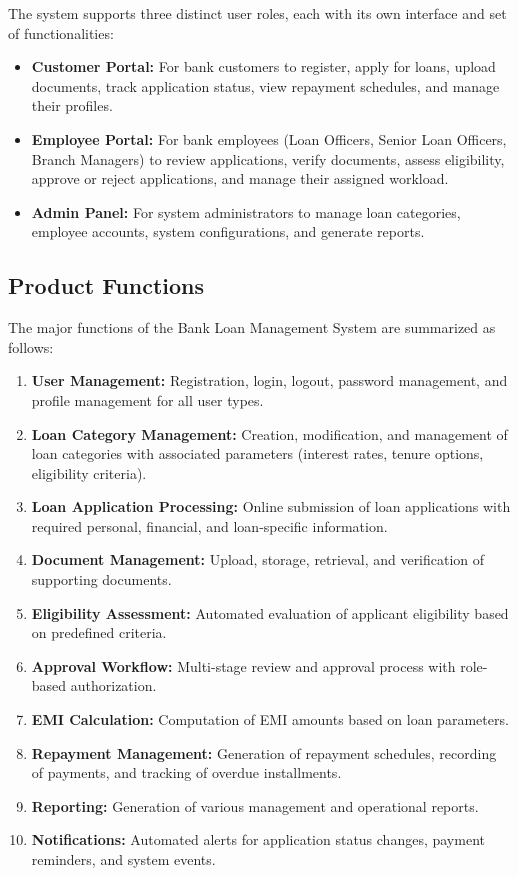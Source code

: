 \documentclass[12pt,a4paper,oneside]{report}
\begin{document}
The system supports three distinct user roles, each with its own interface and set of functionalities:

\begin{itemize}
  \item \textbf{Customer Portal:} For bank customers to register, apply for loans, upload documents, track application status, view repayment schedules, and manage their profiles.
  \item \textbf{Employee Portal:} For bank employees (Loan Officers, Senior Loan Officers, Branch Managers) to review applications, verify documents, assess eligibility, approve or reject applications, and manage their assigned workload.
  \item \textbf{Admin Panel:} For system administrators to manage loan categories, employee accounts, system configurations, and generate reports.
\end{itemize}

\subsection{Product Functions}

The major functions of the Bank Loan Management System are summarized as follows:

\begin{enumerate}
  \item \textbf{User Management:} Registration, login, logout, password management, and profile management for all user types.
  \item \textbf{Loan Category Management:} Creation, modification, and management of loan categories with associated parameters (interest rates, tenure options, eligibility criteria).
  \item \textbf{Loan Application Processing:} Online submission of loan applications with required personal, financial, and loan-specific information.
  \item \textbf{Document Management:} Upload, storage, retrieval, and verification of supporting documents.
  \item \textbf{Eligibility Assessment:} Automated evaluation of applicant eligibility based on predefined criteria.
  \item \textbf{Approval Workflow:} Multi-stage review and approval process with role-based authorization.
  \item \textbf{EMI Calculation:} Computation of EMI amounts based on loan parameters.
  \item \textbf{Repayment Management:} Generation of repayment schedules, recording of payments, and tracking of overdue installments.
  \item \textbf{Reporting:} Generation of various management and operational reports.
  \item \textbf{Notifications:} Automated alerts for application status changes, payment reminders, and system events.
\end{enumerate}
\end{document}
